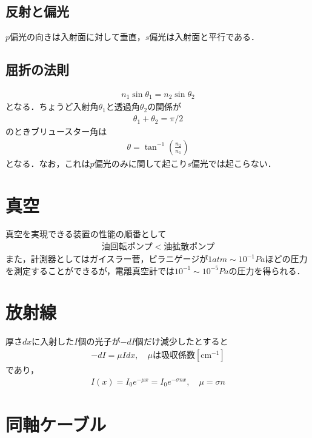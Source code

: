 \documentclass[12pt,dvipdfmx]{jsarticle}
\begin{document}
\subsection*{反射と偏光}
$p$偏光の向きは入射面に対して垂直，$s$偏光は入射面と平行である．
\subsection*{屈折の法則}
\begin{eqnarray}
  n_1 \sin\theta_1 = n_2\sin\theta_2
\end{eqnarray}
となる．ちょうど入射角$\theta_1$と透過角$\theta_2$の関係が
\begin{eqnarray}
  \theta_1 + \theta_2 =\pi/2
\end{eqnarray}
のときブリュースター角は
\begin{eqnarray}
  \theta = \tan^{-1}\left(\frac{n_2}{n_1}\right)
\end{eqnarray}
となる．なお，これは$p$偏光のみに関して起こり$s$偏光では起こらない．
\section*{\Large{真空}}
真空を実現できる装置の性能の順番として
\begin{eqnarray}
  油回転ポンプ < 油拡散ポンプ
\end{eqnarray}
また，計測器としてはガイスラー菅，ピラニゲージが$1atm\sim 10^{-1}Pa$ほどの圧力を測定することができるが，電離真空計では$10^{-1}\sim 10^{-5}Pa$の圧力を得られる．

\section*{\Large{放射線}}
厚さ$dx$に入射した$I$個の光子が$-dI$個だけ減少したとすると
\begin{eqnarray}
  -dI = \mu I dx,\quad \mu は吸収係数[\text{cm}{}^{-1}]
\end{eqnarray}
であり，
\begin{eqnarray}
  I(x) = I_0 e^{-\mu x} = I_0 e^{-\sigma nx},\quad \mu= \sigma n
\end{eqnarray}


\section*{\Large{同軸ケーブル}}
\end{document}

